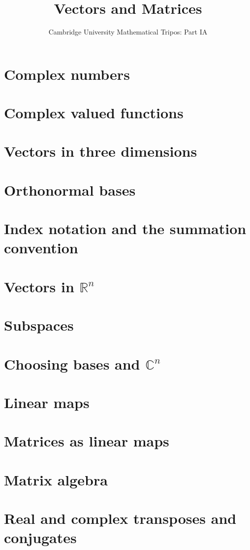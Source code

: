 \documentclass{article}
\title{Vectors and Matrices}
\author{Cambridge University Mathematical Tripos: Part IA}
\begin{document}
\maketitle

\tableofcontentsnewpage{}

\section{Complex numbers}

\section{Complex valued functions}

\section{Vectors in three dimensions}

\section{Orthonormal bases}

\section{Index notation and the summation convention}

\section{Vectors in \(\mathbb R^n\)}

\section{Subspaces}

\section{Choosing bases and \(\mathbb C^n\)}

\section{Linear maps}

\section{Matrices as linear maps}

\section{Matrix algebra}

\section{Real and complex transposes and conjugates}

\end{document}
